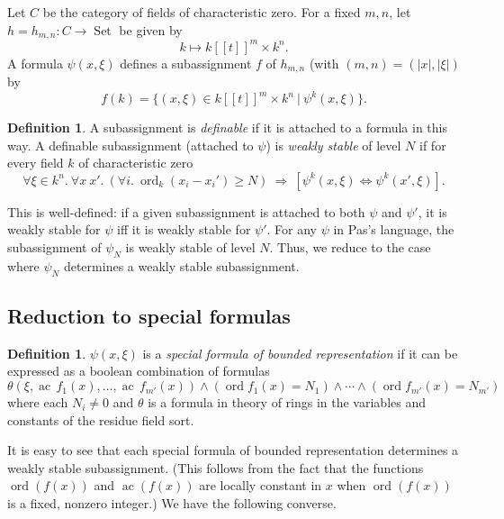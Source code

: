\documentclass[11pt]{amsart}
\theoremstyle{definition}
\newtheorem{definition}[theorem]{Definition}
\theoremstyle{remark}
\numberwithin{equation}{theorem}
\def\tq{{\ \vert\ }}
\def\op#1{\operatorname{#1}}
\begin{document}
Let $C$ be the category of fields of characteristic zero.  For a
fixed $m,n$, let $h=h_{m,n}:C\to\op{Set}$ be given by
    $$k\mapsto k[[t]]^m\times k^n.$$
A formula $\psi(x,\xi)$ defines a subassignment $f$ of $h_{m,n}$
(with $(m,n)=(|x|,|\xi|)$ by
    $$
    f(k) = \{(x,\xi)\in k[[t]]^m\times k^n\tq \psi^k(x,\xi)\}.
    $$
\begin{definition}\label{def:weak}
A subassignment is {\it definable\/} if it is attached to a
formula in this way.   A definable subassignment (attached to
$\psi$) is {\it weakly stable\/} of level $N$ if for every field
$k$ of characteristic zero
    \begin{equation}
    \forall \xi\in k^n.~
    \forall x~x'.~
    (\forall i.~\op{ord}_k(x_i-x_i')\ge N) ~\Rightarrow~
    [\psi^k(x,\xi) \Leftrightarrow \psi^k(x',\xi)].
    \end{equation}
\end{definition}

This is well-defined: if a given subassignment is attached to both
$\psi$ and $\psi'$, it is weakly stable for $\psi$ iff it is
weakly stable for $\psi'$.  For any $\psi$ in Pas's language, the
subassignment of $\psi_N$ is weakly stable of level $N$. Thus, we
reduce to the case where $\psi_N$ determines a weakly stable
subassignment.


\subsection{Reduction to special formulas}

\begin{definition}
    $\psi(x,\xi)$ is a {\it special formula of bounded
    representation\/}
    if it can be expressed as a boolean combination of formulas
\begin{equation}
   \theta(\xi,\op{ac}\,f_1(x),\ldots,\op{ac}\,f_{m'}(x))
   \land (\op{ord} f_1(x) = N_1)
   \land \cdots
   \land (\op{ord} f_{m'}(x) = N_{m'})
   \label{eqn:special}
   \end{equation}
where each $N_i\ne 0$ and $\theta$ is a formula in theory of rings
in the variables and constants of the residue field sort.
\end{definition}

It is easy to see that each special formula of bounded
representation determines a weakly stable subassignment.  (This
follows from the fact that the functions $\op{ord}(f(x))$ and
$\op{ac}(f(x))$ are locally constant in $x$ when $\op{ord}(f(x))$
is a fixed, nonzero integer.)  We have the following converse.
\end{document}
